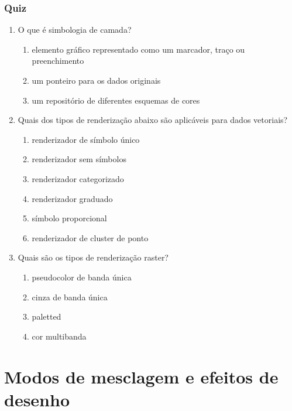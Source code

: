 \documentclass[
]{krantz}
\providecommand{\tightlist}{%
  \setlength{\itemsep}{0pt}\setlength{\parskip}{0pt}}
\begin{document}
\hypertarget{quiz-11}{%
\subsubsection{Quiz}\label{quiz-11}}

\begin{enumerate}
\def\labelenumi{\arabic{enumi}.}
\item
  O que é simbologia de camada?

  \begin{enumerate}
  \def\labelenumii{\alph{enumii}.}
  \tightlist
  \item
    elemento gráfico representado como um marcador, traço ou preenchimento
  \item
    um ponteiro para os dados originais
  \item
    um repositório de diferentes esquemas de cores
  \end{enumerate}
\item
  Quais dos tipos de renderização abaixo são aplicáveis para dados vetoriais?

  \begin{enumerate}
  \def\labelenumii{\alph{enumii}.}
  \tightlist
  \item
    renderizador de símbolo único
  \item
    renderizador sem símbolos
  \item
    renderizador categorizado
  \item
    renderizador graduado
  \item
    símbolo proporcional
  \item
    renderizador de cluster de ponto
  \end{enumerate}
\item
  Quais são os tipos de renderização raster?

  \begin{enumerate}
  \def\labelenumii{\alph{enumii}.}
  \tightlist
  \item
    pseudocolor de banda única
  \item
    cinza de banda única
  \item
    paletted
  \item
    cor multibanda
  \end{enumerate}
\end{enumerate}

\hypertarget{modos-de-mesclagem-e-efeitos-de-desenho}{%
\section{Modos de mesclagem e efeitos de desenho}\label{modos-de-mesclagem-e-efeitos-de-desenho}}
\end{document}
